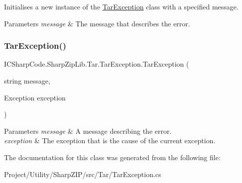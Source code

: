 Initialises a new instance of the \hyperlink{class_i_c_sharp_code_1_1_sharp_zip_lib_1_1_tar_1_1_tar_exception}{Tar\+Exception} class with a specified message. 


\begin{DoxyParams}{Parameters}
{\em message} & The message that describes the error.\\
\hline
\end{DoxyParams}
\mbox{\label{class_i_c_sharp_code_1_1_sharp_zip_lib_1_1_tar_1_1_tar_exception_a3c4043e1a4159997f151cb619efeec11}} 
\subsubsection{\texorpdfstring{Tar\+Exception()}{TarException()}\hspace{0.1cm}{\footnotesize\ttfamily [4/4]}}
{\footnotesize\ttfamily I\+C\+Sharp\+Code.\+Sharp\+Zip\+Lib.\+Tar.\+Tar\+Exception.\+Tar\+Exception (\begin{DoxyParamCaption}\item[{string}]{message,  }\item[{Exception}]{exception }\end{DoxyParamCaption})\hspace{0.3cm}{\ttfamily [inline]}}






\begin{DoxyParams}{Parameters}
{\em message} & A message describing the error.\\
\hline
{\em exception} & The exception that is the cause of the current exception.\\
\hline
\end{DoxyParams}


The documentation for this class was generated from the following file\+:\begin{DoxyCompactItemize}
\item 
Project/\+Utility/\+Sharp\+Z\+I\+P/src/\+Tar/Tar\+Exception.\+cs\end{DoxyCompactItemize}
